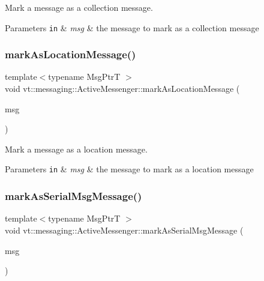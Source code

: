 Mark a message as a collection message. 


\begin{DoxyParams}[1]{Parameters}
\mbox{\tt in}  & {\em msg} & the message to mark as a collection message \\
\hline
\end{DoxyParams}
\mbox{\label{structvt_1_1messaging_1_1_active_messenger_ae813b0555258b09de8fa324ed98dcd02}} 
\subsubsection{\texorpdfstring{mark\+As\+Location\+Message()}{markAsLocationMessage()}}
{\footnotesize\ttfamily template$<$typename Msg\+PtrT $>$ \\
void vt\+::messaging\+::\+Active\+Messenger\+::mark\+As\+Location\+Message (\begin{DoxyParamCaption}\item[{Msg\+PtrT const}]{msg }\end{DoxyParamCaption})}



Mark a message as a location message. 


\begin{DoxyParams}[1]{Parameters}
\mbox{\tt in}  & {\em msg} & the message to mark as a location message \\
\hline
\end{DoxyParams}
\mbox{\label{structvt_1_1messaging_1_1_active_messenger_ae4f8d48cda11b13d4447ab253ff18bf2}} 
\subsubsection{\texorpdfstring{mark\+As\+Serial\+Msg\+Message()}{markAsSerialMsgMessage()}}
{\footnotesize\ttfamily template$<$typename Msg\+PtrT $>$ \\
void vt\+::messaging\+::\+Active\+Messenger\+::mark\+As\+Serial\+Msg\+Message (\begin{DoxyParamCaption}\item[{Msg\+PtrT const}]{msg }\end{DoxyParamCaption})}



